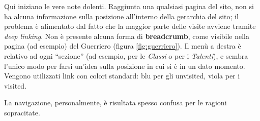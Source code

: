 Qui iniziano le vere note dolenti. Raggiunta una qualsiasi pagina del sito, non si ha alcuna informazione sulla posizione
all'interno della gerarchia del sito; il problema è alimentato dal fatto che la maggior parte delle visite avviene tramite
\emph{deep linking}. Non è presente alcuna forma di \textbf{breadcrumb}, come visibile nella pagina (ad esempio) del Guerriero 
(figura \ref{fig:guerriero}).
Il menù a destra è relativo ad ogni ``sezione'' (ad esempio, per le \emph{Classi} o per i \emph{Talenti}), e sembra l'unico modo 
per farsi un'idea sulla posizione in cui si è in un dato momento. Vengono utilizzati link con colori standard: blu per gli unvisited, viola 
per i visited. \par
La navigazione, personalmente, è risultata spesso confusa per le ragioni sopracitate.